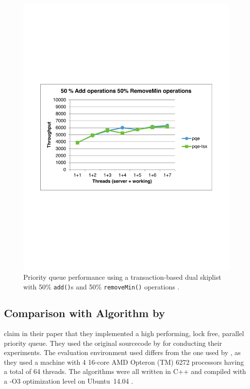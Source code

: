 \begin{figure}[htb]
\begin{minipage}{.495\textwidth}
		\includegraphics[width=\linewidth]{graphics/tsx-50-50.pdf}
		\caption{Priority queue performance using a transaction-based dual skiplist with 50\% \texttt{add()}s and 50\% \texttt{removeMin()} operations \cite{calciu_adaptive_2014}.}
		\label{fig:tsx2}
	\end{minipage}
\end{figure}

\subsection{Comparison with Algorithm by \citeauthor{braginsky_cbpq:_2016}}

\citeauthor{braginsky_cbpq:_2016} claim in their paper that they implemented a high performing, lock free, parallel priority queue. They used the original sourcecode by \citeauthor{calciu_adaptive_2014} for conducting their experiments. The evaluation environment used differs from the one used by \citeauthor{calciu_adaptive_2014}, as they used a machine with 4 16-core AMD Opteron (TM) 6272 processors having a total of 64 threads. The algorithms were all written in C++ and compiled with a -O3 optimization level on Ubuntu~14.04 \cite{braginsky_cbpq:_2016}.


